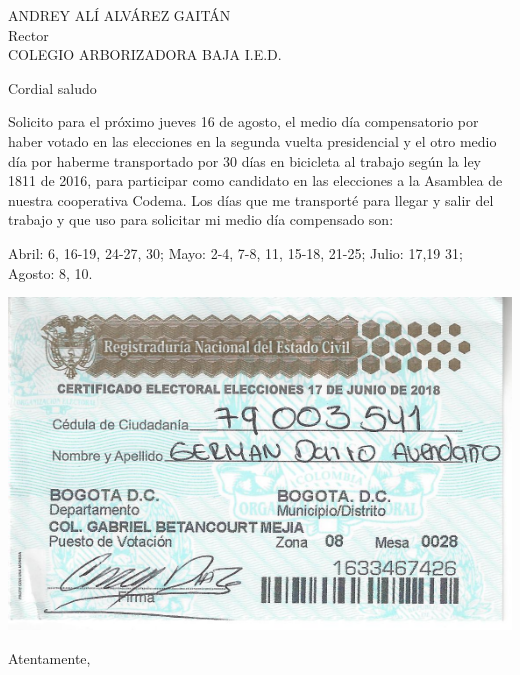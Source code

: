 \documentclass[letterpaper,spanish]{letter}
\date{14 de agosto de 2018}
\begin{document}
\begin{letter}{ANDREY ALÍ ALVÁREZ GAITÁN\\Rector\\COLEGIO ARBORIZADORA BAJA I.E.D.}
	
\opening{Cordial saludo}
Solicito para el próximo jueves 16 de agosto, el medio día compensatorio por haber votado en las elecciones en la segunda vuelta presidencial y el otro medio día por haberme transportado por 30 días en bicicleta al trabajo según la ley 1811 de 2016, para participar como candidato en las elecciones a la Asamblea de nuestra cooperativa Codema. Los días que me transporté para llegar y salir del trabajo y que uso para solicitar mi medio día compensado son:

Abril: 6, 16-19, 24-27, 30; Mayo: 2-4, 7-8, 11, 15-18, 21-25; Julio: 17,19 31; Agosto: 8, 10.

\begin{center}
\includegraphics[scale=1]{Images/Compensatorio.pdf} 
\end{center}

\closing{Atentamente,}


\end{letter}
\end{document}
